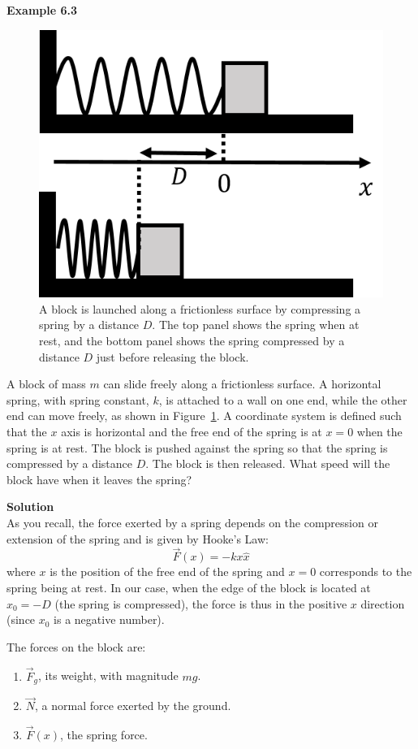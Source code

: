 \begin{framed}
\textbf{Example 6.3}\\
\begin{figure}[!htbp]
\centering
\includegraphics[width=0.4\linewidth]{files/blockspring-fdb4d8979bbf11d976ccd124d9539f46.png}
\caption[]{A block is launched along a frictionless surface by compressing a spring by a distance $D$. The top panel shows the spring when at rest, and the bottom panel shows the spring compressed by a distance $D$ just before releasing the block.}
\label{fig:applyingnewtonslaws:blockspring}
\end{figure}

A block of mass $m$ can slide freely along a frictionless surface. A horizontal spring, with spring constant, $k$, is attached to a wall on one end, while the other end can move freely, as shown in Figure~\ref{fig:applyingnewtonslaws:blockspring}. A coordinate system is defined such that the $x$ axis is horizontal and the free end of the spring is at $x=0$ when the spring is at rest. The block is pushed against the spring so that the spring is compressed by a distance $D$. The block is then released. What speed will the block have when it leaves the spring?

\begin{framed}
\textbf{Solution}\\
As you recall, the force exerted by a spring depends on the compression or extension of the spring and is given by Hooke's Law:
\begin{equation}
\vec F(x) = -kx\hat x
\end{equation}
where $x$ is the position of the free end of the spring and $x=0$ corresponds to the spring being at rest. In our case, when the edge of the block is located at $x_0= -D$ (the spring is compressed), the force is thus in the positive $x$ direction (since $x_0$ is a negative number).

The forces on the block are:

\begin{enumerate}
\item $\vec F_g$, its weight, with magnitude $mg$.
\item $\vec N$, a normal force exerted by the ground.
\item $\vec F(x)$, the spring force.
\end{enumerate}


\end{framed}
\end{framed}
